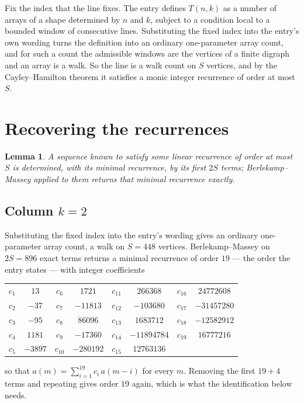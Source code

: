 \documentclass[11pt,a4paper]{article}
\theoremstyle{plain}
\newtheorem{lemma}[theorem]{Lemma}
\theoremstyle{definition}
\begin{document}
Fix the index that the line fixes. The entry defines $T(n,k)$ as a number of arrays of a shape
determined by $n$ and $k$, subject to a condition local to a bounded window of consecutive
lines. Substituting the fixed index into the entry's own wording turns the definition into an
ordinary one-parameter array count, and for such a count the admissible windows are the
vertices of a finite digraph and an array is a walk. So the line is a walk count on $S$
vertices, and by the Cayley--Hamilton theorem it satisfies a monic integer recurrence of order
at most $S$.

\section{Recovering the recurrences}

\begin{lemma}\label{lem:bm}
A sequence known to satisfy some linear recurrence of order at most $S$ is determined, with its
minimal recurrence, by its first $2S$ terms; Berlekamp--Massey applied to them returns that
minimal recurrence exactly.
\end{lemma}

\subsection*{Column $k=2$}
Substituting the fixed index into the entry's wording gives an ordinary one-parameter array
count, a walk on $S=448$ vertices. Berlekamp--Massey on $2S=896$ exact terms
returns a minimal recurrence of order $19$ --- the order the entry states --- with
integer coefficients
\begin{center}\small\begin{tabular}{cccccccc}
$c_{1}$ & $13$ & $c_{6}$ & $1721$ & $c_{11}$ & $266368$ & $c_{16}$ & $24772608$ \\
$c_{2}$ & $-37$ & $c_{7}$ & $-11813$ & $c_{12}$ & $-103680$ & $c_{17}$ & $-31457280$ \\
$c_{3}$ & $-95$ & $c_{8}$ & $86096$ & $c_{13}$ & $1683712$ & $c_{18}$ & $-12582912$ \\
$c_{4}$ & $1181$ & $c_{9}$ & $-17360$ & $c_{14}$ & $-11894784$ & $c_{19}$ & $16777216$ \\
$c_{5}$ & $-3897$ & $c_{10}$ & $-280192$ & $c_{15}$ & $12763136$ &  &  \\
\end{tabular}\end{center}
so that $a(m)=\sum_{i=1}^{19}c_i\,a(m-i)$ for every $m$. Removing the first
$19+4$ terms and repeating gives order $19$ again, which is what the
identification below needs.
\end{document}
